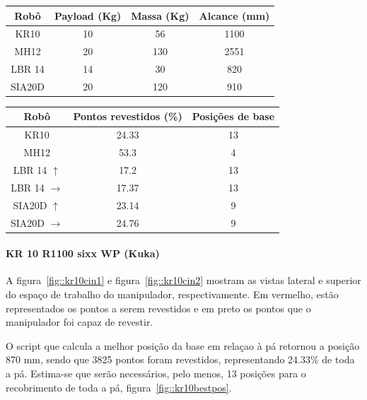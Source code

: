 \begin{center}
\begin{tabular}{  c | c | c | c  }
  \hline
  \textbf{Robô} & \textbf{Payload (Kg)} & \textbf{Massa (Kg)} & \textbf{Alcance
  (mm)} \\ \hline 
  KR10 & 10 & 56 & 1100 \\ \hline
  MH12 & 20 & 130 & 2551  \\ \hline
  LBR 14 & 14 & 30 & 820 \\ \hline
  SIA20D & 20 & 120 &  910 \\
  \hline
\end{tabular}
\label{tab::robocarac}
\end{center}

\begin{center}
\begin{tabular}{  c | c | c }
  \hline
  \textbf{Robô} & \textbf{Pontos revestidos (\%)} & \textbf{Posições de base} \\ \hline 
  KR10 & 24.33 & 13\\ \hline 
  MH12 & 53.3 & 4   \\ \hline
  LBR 14 $\uparrow$ & 17.2 & 13 \\ \hline
  LBR 14 $\rightarrow$ & 17.37 & 13 \\ \hline
  SIA20D $\uparrow$ & 23.14 & 9 \\ \hline
  SIA20D $\rightarrow$ & 24.76 & 9 \\ 
  \hline
\end{tabular}
\label{tab::robocin}
\end{center}

\paragraph{KR 10 R1100 sixx WP (Kuka)}
A figura~\ref{fig::kr10cin1} e figura~\ref{fig::kr10cin2} mostram as vistas
lateral e superior do espaço de trabalho do manipulador, respectivamente. Em
vermelho, estão representados os pontos a serem revestidos e em preto os pontos
que o manipulador foi capaz de revestir.

O script que calcula a melhor posição da base em relaçao à pá retornou a posição
870 mm, sendo que 3825 pontos foram revestidos, representando 24.33\% de toda a
pá. Estima-se que serão necessários, pelo menos, 13 posições para o recobrimento
de toda a pá, figura~\ref{fig::kr10bestpos}.



